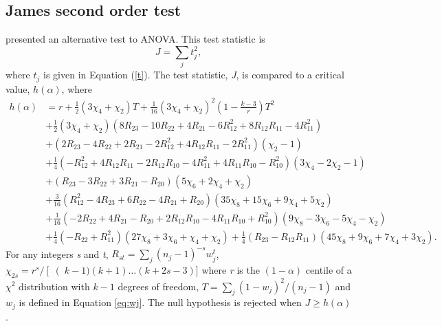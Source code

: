 \subsection{James second order test}
\citet{JAMES:1951} presented an alternative test to ANOVA. This test statistic is
\begin{equation}
J=\sum_{j}t_j^2,
\end{equation}
where $t_j$ is given in Equation (\ref{t}). The test statistic, \textit{J}, is compared to a critical value, $h(\alpha)$, where
\begin{equation*}
\begin{split}
h(\alpha)& =r+\frac{1}{2}(3\chi_4+\chi_2) T + \frac{1}{16}(3\chi_4+\chi_2)^2 \left(1-\frac{k-3}{r}\right)T^2\\
&+\frac{1}{2}(3\chi_4+\chi_2) (8R_{23}-10R_{22}+4R_{21}-6R_{12}^2+8R_{12}R_{11}-4R_{11}^2)  \\
&+(2R_{23}-4R_{22}+2R_{21}-2R_{12}^2+4R_{12}R_{11}-2R_{11}^2)(\chi_2-1)\\
&+\frac{1}{4}(-R_{12}^2+4R_{12}R_{11}-2R_{12}R_{10}-4R_{11}^2+4R_{11}R_{10}-R_{10}^2)(3\chi_4-2\chi_2-1)\\
&+(R_{23}-3R_{22}+3R_{21}-R_{20})(5\chi_6+2\chi_4+\chi_2)\\
&+\frac{3}{16}(R_{12}^2-4R_{23}+6R_{22}-4R_{21}+R_{20})(35\chi_8+15\chi_6+9\chi_4+5\chi_2)\\
&+\frac{1}{16}(-2R_{22}+4R_{21}-R_{20}+2R_{12}R_{10}-4R_{11}R_{10}+R_{10}^2)(9\chi_8-3\chi_6-5\chi_4-\chi_2)\\
&+\frac{1}{4}(-R_{22}+R_{11}^2)(27\chi_8+3\chi_6+\chi_4+\chi_2)+\frac{1}{4}(R_{23}-R_{12}R_{11})(45\chi_8+9\chi_6+7\chi_4+3\chi_2).
\end{split}
\end{equation*}
For any integers \textit{s} and \textit{t}, $R_{st}=\sum_{j}(n_j-1)^{-s}w_j^t$,  $\chi_{2s}=r^s/\left[ \right (k-1)(k+1)\ldots(k+2s-3)]$
where \textit{r} is the $(1-\alpha)$ centile of a $\chi^2$ distribution with $k-1$ degrees of freedom, $T=\sum_j(1-w_j)^2/(n_j-1)$ and $w_j$ is defined in Equation \ref{eq:wj}. 
The null hypothesis is rejected when \begin{math}
J \geqslant h(\alpha)
\end{math}.

